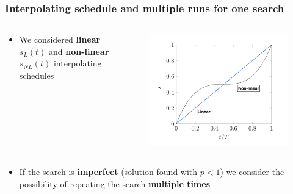 \documentclass{beamer}
\newcommand{\bb}[1]{\textbf{\textcolor{darkish_blue}{#1}}}
\begin{document}
\begin{frame}
\frametitle{Interpolating schedule and multiple runs for one search}
\begin{columns}
	\begin{column}[T]{0.45\textwidth}
		\vspace{0.75cm}
		\begin{itemize}
			\item We considered  \bb{linear} $s_L(t)$ and \bb{non-linear} $s_{NL}(t)$ interpolating schedules
		\end{itemize}
	\end{column}
	\begin{column}[T]{0.45\textwidth}
		\vspace{-0.75cm}
		\begin{figure}
			\centering
			\includegraphics[width=\textwidth]{interpolating_schedule.png}
		\end{figure}
	\end{column}

\end{columns}


\begin{itemize}
	\item If the search is \bb{imperfect} (solution found with $p<1$) we consider the possibility of repeating the search \bb{multiple times}
\end{itemize}
\end{frame}

\end{document}
